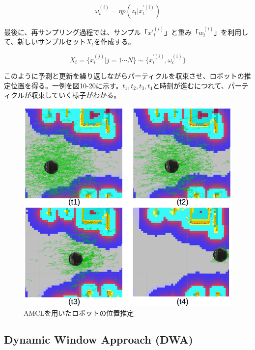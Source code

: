 \begin{equation}
  \omega_t^{(i)} = \eta p(z_t|x_t^{\prime(i)})
\end{equation}

最後に、再サンプリング過程では、サンプル「${x’}_t^{(i)}$」と重み「$w_t^{(i)}$」を利用して、新しいサンプルセット$X_t$を作成する。

\begin{equation}
  X_t = \{x_t^{(j)} | j=1 \cdots N\} \sim \{x_t^{\prime(i)},\omega_t^{(i)}\}
\end{equation}

このように予測と更新を繰り返しながらパーティクルを収束させ、ロボットの推定位置を得る。一例を図10-20に示す。$t_1, t_2, t_3, t_4$と時刻が進むにつれて、パーティクルが収束していく様子がわかる。

\begin{figure}[htp]
  \centering
  \includegraphics[width=\columnwidth]{pictures/chapter10/pic_10_20.png}
  \caption{AMCLを用いたロボットの位置推定}
\end{figure}


\subsection{Dynamic Window Approach (DWA)}

